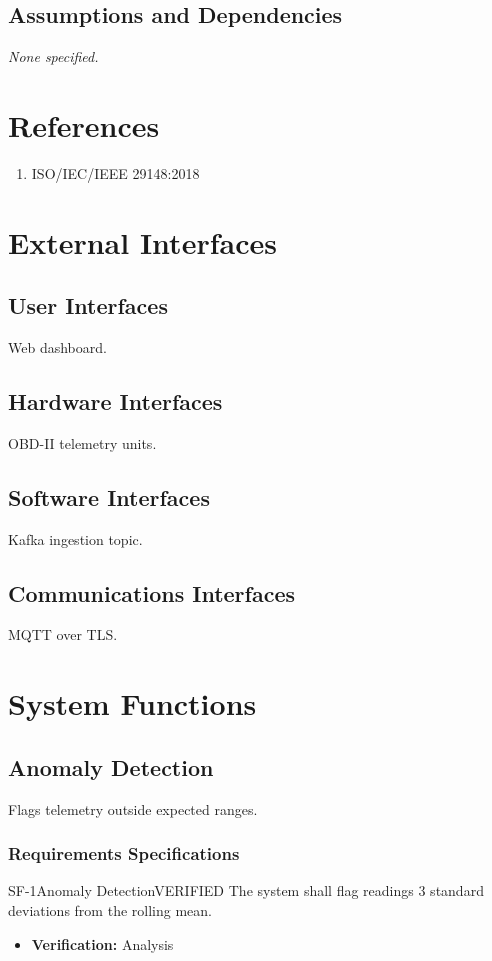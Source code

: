 \documentclass[11pt,a4paper]{article}
\begin{document}
\subsection{Assumptions and Dependencies}
\textit{None specified.}\par\vspace{6pt}
\section{References}
\begin{enumerate}[leftmargin=*]
    \item ISO/IEC/IEEE 29148:2018
\end{enumerate}

\section{External Interfaces}
\subsection{User Interfaces}
Web dashboard.

\subsection{Hardware Interfaces}
OBD-II telemetry units.

\subsection{Software Interfaces}
Kafka ingestion topic.

\subsection{Communications Interfaces}
MQTT over TLS.

\section{System Functions}
\subsection{Anomaly Detection}
Flags telemetry outside expected ranges.

\subsubsection*{Requirements Specifications}
\begin{requirementbox}{SF-1}{Anomaly Detection}{VERIFIED}
The system shall flag readings 3 standard deviations from the rolling mean.
\begin{itemize}[leftmargin=*,itemsep=2pt,topsep=4pt]
    \item \textbf{Verification:} Analysis
\end{itemize}
\end{requirementbox}
\end{document}
